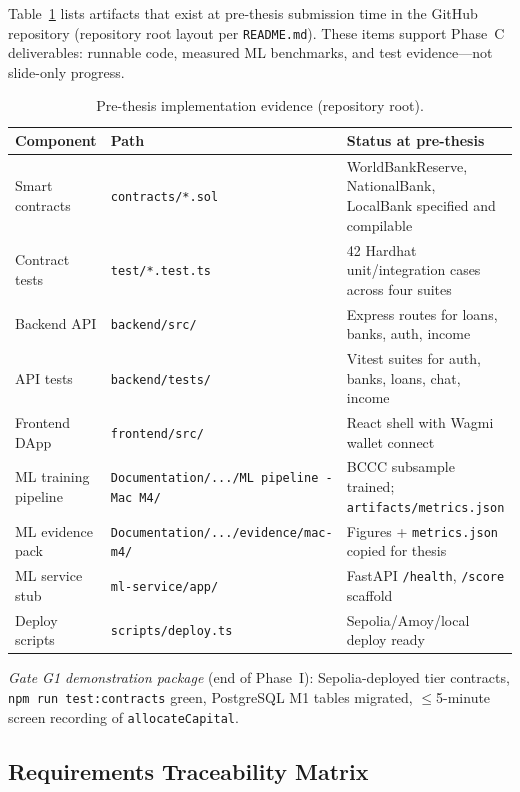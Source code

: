 \documentclass[12pt,a4paper]{report}
\newcommand{\tableheadcolor}{\rowcolor{TableHeadBg}}
\begin{document}
Table~\ref{tab:implementation-evidence} lists artifacts that exist at pre-thesis submission time in the GitHub repository (repository root layout per \texttt{README.md}). These items support Phase~C deliverables: runnable code, measured ML benchmarks, and test evidence---not slide-only progress.

\begin{table}[H]
\centering
\caption[Pre-thesis implementation evidence]{Pre-thesis implementation evidence (repository root).}
\label{tab:implementation-evidence}
\small
\begin{tabular}{@{}p{3.2cm}p{4.4cm}p{6.6cm}@{}}
\toprule
\tableheadcolor
\textbf{Component} & \textbf{Path} & \textbf{Status at pre-thesis} \\
\midrule
Smart contracts & \texttt{contracts/*.sol} & WorldBankReserve, NationalBank, LocalBank specified and compilable \\
Contract tests & \texttt{test/*.test.ts} & 42 Hardhat unit/integration cases across four suites \\
Backend API & \texttt{backend/src/} & Express routes for loans, banks, auth, income \\
API tests & \texttt{backend/tests/} & Vitest suites for auth, banks, loans, chat, income \\
Frontend DApp & \texttt{frontend/src/} & React shell with Wagmi wallet connect \\
ML training pipeline & \texttt{Documentation/.../ML pipeline - Mac M4/} & BCCC subsample trained; \texttt{artifacts/metrics.json} \\
ML evidence pack & \texttt{Documentation/.../evidence/mac-m4/} & Figures + \texttt{metrics.json} copied for thesis \\
ML service stub & \texttt{ml-service/app/} & FastAPI \texttt{/health}, \texttt{/score} scaffold \\
Deploy scripts & \texttt{scripts/deploy.ts} & Sepolia/Amoy/local deploy ready \\
\bottomrule
\end{tabular}
\end{table}

\noindent\textit{Gate G1 demonstration package} (end of Phase~I): Sepolia-deployed tier contracts, \texttt{npm run test:contracts} green, PostgreSQL M1 tables migrated, $\leq$5-minute screen recording of \texttt{allocateCapital}.

\subsection{Requirements Traceability Matrix}
\label{sec:traceability}
\end{document}
